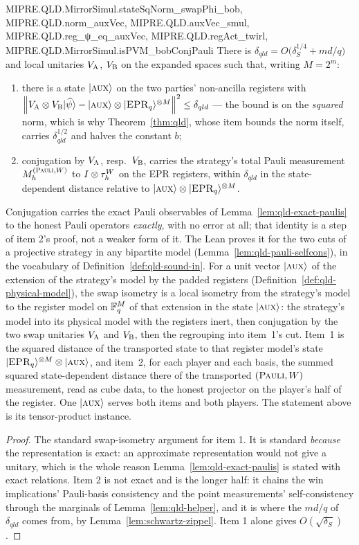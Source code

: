 \begin{lemma}
{  MIPRE.QLD.MirrorSimul.stateSqNorm_swapPhi_bob, MIPRE.QLD.norm_auxVec, MIPRE.QLD.auxVec_smul,
  MIPRE.QLD.reg_ψ_eq_auxVec, MIPRE.QLD.regAct_twirl, MIPRE.QLD.MirrorSimul.isPVM_bobConjPauli}
\leanok
There is $\delta_{qld} = O\bigl( \delta_S^{1/4} + md/q \bigr)$ and local unitaries $V_{\textsc{A}}$,
$V_{\textsc{B}}$ on the expanded spaces such that, writing $M = 2^m$:
\begin{enumerate}
\item there is a state $|\textsc{aux}\rangle$ on the two parties' non-ancilla registers with
  $\left\| { V_{\textsc{A}} \otimes V_{\textsc{B}} |\widehat{\psi}\rangle - |\textsc{aux}\rangle \otimes |\textsc{EPR}_q\rangle^{\otimes M} } \right\|^2
  \leq \delta_{qld}$ --- the bound is on the \emph{squared} norm, which is why
  Theorem~\ref{thm:qld}, whose item bounds the norm itself, carries $\delta_{qld}^{1/2}$ and
  halves the constant $b$;
\item conjugation by $V_{\textsc{A}}$, resp.\ $V_{\textsc{B}}$, carries the strategy's total Pauli measurement
  $M^{(\textsc{Pauli},W)}_h$ to $I \otimes \tau^W_h$ on the EPR registers, within $\delta_{qld}$ in the
  state-dependent distance relative to $|\textsc{aux}\rangle \otimes |\textsc{EPR}_q\rangle^{\otimes M}$.
\end{enumerate}
Conjugation carries the exact Pauli observables of Lemma~\ref{lem:qld-exact-paulis} to the honest
Pauli operators \emph{exactly}, with no error at all; that identity is a step of item 2's proof,
not a weaker form of it. The Lean proves it for the two cuts of a projective strategy in any
bipartite model (Lemma~\ref{lem:qld-pauli-selfcons}), in the vocabulary of
Definition~\ref{def:qld-sound-in}. For a unit vector $|\textsc{aux}\rangle$ of the extension of the
strategy's model by the padded registers (Definition~\ref{def:qld-physical-model}), the swap
isometry is a local isometry from the strategy's model to the register model on $\mathbb{F}_q^M$ of that
extension in the state $|\textsc{aux}\rangle$: the strategy's model into its physical model with the
registers inert, then conjugation by the two swap unitaries $V_{\textsc{A}}$ and $V_{\textsc{B}}$, then the
regrouping into item~1's cut. Item~1 is the squared distance of the transported state to that
register model's state $|\textsc{EPR}_q\rangle^{\otimes M} \otimes |\textsc{aux}\rangle$, and item~2, for each player and each
basis, the summed squared state-dependent distance there of the transported $(\textsc{Pauli}, W)$
measurement, read as cube data, to the honest projector on the player's half of the register. One
$|\textsc{aux}\rangle$ serves both items and both players. The statement above is its tensor-product
instance.
\end{lemma}

\begin{proof}
\leanok
The standard swap-isometry argument for item 1. It is standard \emph{because} the representation is
exact: an approximate representation would not give a unitary, which is the whole reason
Lemma~\ref{lem:qld-exact-paulis} is stated with exact relations. Item 2 is not exact and is the
longer half: it chains the win implications' Pauli-basis consistency and the point measurements'
self-consistency through the marginals of Lemma~\ref{lem:qld-helper}, and it is where the $md/q$ of
$\delta_{qld}$ comes from, by Lemma~\ref{lem:schwartz-zippel}. Item 1 alone gives
$O(\sqrt{\delta_S})$.
\end{proof}

